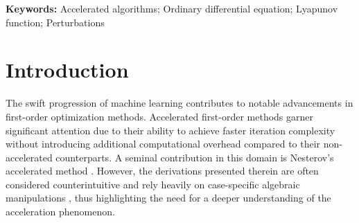 \documentclass[11pt]{article}
\newcommand{\1}{\mathbf 1}
\numberwithin{equation}{section}
\begin{document}
{\bf Keywords:} Accelerated algorithms; Ordinary differential equation; Lyapunov function; Perturbations 

\section{Introduction}
The swift progression of machine learning contributes to notable advancements in first-order optimization methods. Accelerated first-order methods garner significant attention due to their ability to achieve faster iteration complexity without introducing additional computational overhead compared to their non-accelerated counterparts. A seminal contribution in this domain is Nesterov's accelerated method \cite{Nesterov_1983_method, Nesterov_2018_lectures}. However, the derivations presented therein are often considered counterintuitive and rely heavily on case-specific algebraic manipulations \cite{Juditsky_2013_convex}, thus highlighting the need for a deeper understanding of the acceleration phenomenon.
\end{document}
